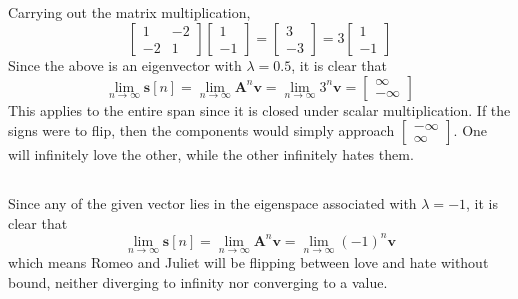 \documentclass[]{article}
\numberwithin{equation}{section}
\begin{document}
\subsection{}

Carrying out the matrix multiplication, 
\begin{equation}
	\begin{bmatrix}
	1 & -2 \\
	-2 & 1
	\end{bmatrix}
	\begin{bmatrix}
	1 \\
	-1
	\end{bmatrix}
	=
	\begin{bmatrix}
	3 \\
	-3
	\end{bmatrix}
	=
	3\begin{bmatrix}
	1 \\
	-1
	\end{bmatrix}
\end{equation}
Since the above is an eigenvector with \(\lambda = 0.5\), it is clear that 
\begin{equation}
	\lim_{n \to \infty} \mathbf{s}[n] = \lim_{n \to \infty} \mathbf{A}^n \mathbf{v} = \lim_{n \to \infty} 3^n \mathbf{v} = \begin{bmatrix}
	\infty \\
	-\infty
	\end{bmatrix}
\end{equation}
This applies to the entire span since it is closed under scalar multiplication. 
If the signs were to flip, then the components would simply approach \(\begin{bmatrix}
-\infty \\
\infty
\end{bmatrix}\). 
One will infinitely love the other, while the other infinitely hates them. 

\subsection{}

Since any of the given vector lies in the eigenspace associated with \(\lambda = -1\), it is clear that 
\begin{equation}
	\lim_{n \to \infty} \mathbf{s}[n] = \lim_{n \to \infty} \mathbf{A}^n \mathbf{v} = \lim_{n \to \infty} (-1)^n \mathbf{v}
\end{equation}
which means Romeo and Juliet will be flipping between love and hate without bound, neither diverging to infinity nor converging to a value. 
\end{document}
